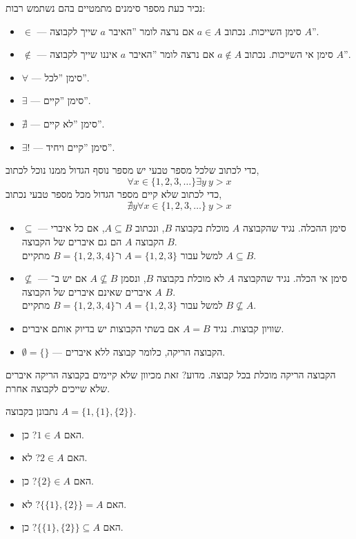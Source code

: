 נכיר כעת מספר סימנים מתמטיים בהם נשתמש רבות:
\begin{itemize}
    \item $\in$ --- סימן השייכות. נכתוב $a \in A$ אם נרצה לומר ''האיבר $a$ שייך לקבוצה $A$''.
    \item $\notin$ --- סימן אי השייכות. נכתוב $a \notin A$ אם נרצה לומר ''האיבר $a$ איננו שייך לקבוצה $A$''.
    \item $\forall$ --- סימן ''לכל''.
    \item $\exists$ --- סימן ''קיים''.
    \item $\nexists$ --- סימן ''לא קיים''.
    \item $\exists! $ --- סימן ''קיים ויחיד''.
\end{itemize}
\begin{example}
	כדי לכתוב שלכל מספר טבעי יש מספר נוסף הגדול ממנו נוכל לכתוב,
	\[
		\forall x \in \{1, 2, 3, \ldots\} \exists y \ y > x
	\]
	כדי לכתוב שלא קיים מספר הגדול מכל מספר טבעי נכתוב,
	\[
		\nexists y \forall x \in \{1, 2, 3, \ldots\}\ y > x
	\]
\end{example}
\begin{itemize}
    \item $\subseteq$ --- סימן ההכלה. נגיד שהקבוצה $A$ מוכלת בקבוצה $B$, ונכתוב $A \subseteq B$, אם כל איברי הקבוצה $A$ הם גם איברים של הקבוצה $B$. \\
    למשל עבור $A = \{1, 2, 3\}$ ו־$B = \{1, 2, 3, 4\}$ מתקיים $A \subseteq B$.
    \item $\nsubseteq$ --- סימן אי הכלה. נגיד שהקבוצה $A$ לא מוכלת בקבוצה $B$, ונסמן $A \nsubseteq B$ אם יש ב־$A$ איברים שאינם איברים של הקבוצה $B$. \\
    למשל עבור $A = \{1, 2, 3\}$ ו־$B = \{1, 2, 3, 4\}$ מתקיים $B \nsubseteq A$.
    \item שוויון קבוצות. נגיד $A = B$ אם בשתי הקבוצות יש בדיוק אותם איברים.
    \item $\emptyset = \{\}$ --- הקבוצה הריקה, כלומר קבוצה ללא איברים.
\end{itemize}
\begin{remark}
	הקבוצה הריקה מוכלת בכל קבוצה. מדוע? זאת מכיוון שלא קיימים בקבוצה הריקה איברים שלא שייכים לקבוצה אחרת.
\end{remark}
\begin{example}
	נתבונן בקבוצה $A = \{1, \{1\}, \{2\}\}$.
	\begin{itemize}
		\item האם $1 \in A$? כן.
		\item האם $2 \in A$? לא.
		\item האם $\{2\} \in A$? כן.
		\item האם $\{\{1\}, \{2\}\} = A$? לא.
		\item האם $\{\{1\}, \{2\}\} \subseteq A$? כן.
	\end{itemize}
\end{example}

